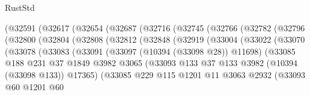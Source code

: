 \begin{lexlean}{RustStd}
\begin{coremodule}
              (@32591
                (@32617
                  (@32654
                    (@32687
                      (@32716
                        (@32745
                          (@32766
                            (@32782
                              (@32796
                                (@32800
                                  (@32804
                                    (@32808
                                      (@32812
                                        (@32848
                                          (@32919
                                            (@33004
                                              (@33022
                                                (@33070
                                                  (@33078
                                                    (@33083
                                                      (@33091
                                                        (@33097 (@10394 (@33098 @28)) @11698)
                                                        (@33085
                                                          @188
                                                          @231
                                                          @37
                                                          @1849
                                                          @3982
                                                          @3065
                                                          (@33093
                                                            @133
                                                            @37
                                                            @133
                                                            @3982
                                                            (@10394 (@33098 @133))
                                                            @17365)
                                                          (@33085
                                                            @229
                                                            @115
                                                            @1201
                                                            @11
                                                            @3063
                                                            @2932
                                                            (@33093
                                                              @60
                                                              @1201
                                                              @60

\end{coremodule}
\end{lexlean}
